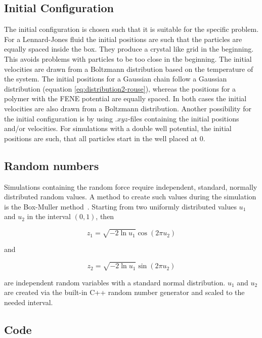\documentclass[a4paper]{article}
\begin{document}
\subsection{Initial Configuration}

The initial configuration is chosen such that it is suitable for the specific problem. For a Lennard-Jones fluid the initial positions are such that the particles are equally spaced inside the box. They produce a crystal like grid in the beginning. This avoids problems with particles to be too close in the beginning. The initial velocities are drawn from a Boltzmann distribution based on the temperature of the system. The initial positions for a Gaussian chain follow a Gaussian distribution (equation \ref{eq:distribution2-rouse}), whereas the positions for a polymer with the FENE potential are equally spaced. In both cases the initial velocities are also drawn from a Boltzmann distribution. Another possibility for the initial configuration is by using $.xyz$-files containing the initial positions and/or velocities. For simulations with a double well potential, the initial positions are such, that all particles start in the well placed at 0.

\subsection{Random numbers}

Simulations containing the random force require independent, standard, normally distributed random values. A method to create such values during the simulation is the Box-Muller method~\cite{Box1958}. Starting from two uniformly distributed values $u_1$ and $u_2$ in the interval $(0,1)$, then

\begin{equation}
z_1 = \sqrt{-2 \ln u_1} \cos (2 \pi u_2)
\end{equation}

and

\begin{equation}
z_2 = \sqrt{-2 \ln u_1} \sin (2 \pi u_2)
\end{equation}

are independent random variables with a standard normal distribution. $u_1$ and $u_2$ are created via the built-in C++ random number generator and scaled to the needed interval.

\subsection{Code}
\end{document}
